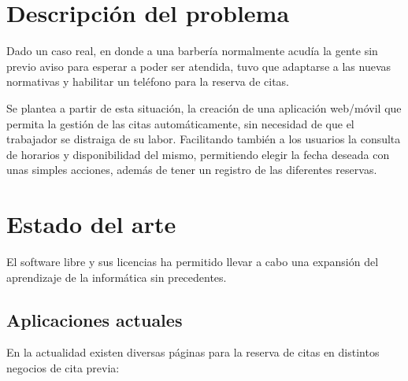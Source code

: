 \section{Descripción del problema}

Dado un caso real, en donde a una barbería normalmente acudía la gente sin previo aviso para esperar a
poder ser atendida, tuvo que adaptarse a las nuevas normativas y habilitar un teléfono para la reserva de citas.

Se plantea a partir de esta situación, la creación de una aplicación web/móvil que permita la gestión de las citas
automáticamente, sin necesidad de que el trabajador se distraiga de su labor. Facilitando también a los usuarios la
consulta de horarios y disponibilidad del mismo, permitiendo elegir la fecha deseada con unas simples acciones,
además de tener un registro de las diferentes reservas.

\section{Estado del arte}

El software libre y sus licencias \cite{gplv3} ha permitido llevar a cabo una expansión del
aprendizaje de la informática sin precedentes.

\subsection{Aplicaciones actuales}

En la actualidad existen diversas páginas para la reserva de citas en distintos negocios de cita previa:

